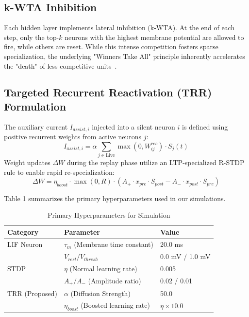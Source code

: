 \documentclass{article}
\begin{document}
\subsection{k-WTA Inhibition}
Each hidden layer implements lateral inhibition (k-WTA). At the end of each step, only the top-$k$ neurons with the highest membrane potential are allowed to fire, while others are reset. While this intense competition fosters sparse specialization, the underlying "Winners Take All" principle inherently accelerates the "death" of less competitive units~\cite{hellman1998winners}.

\subsection{Targeted Recurrent Reactivation (TRR) Formulation}
The auxiliary current $I_{assist,i}$ injected into a silent neuron $i$ is defined using positive recurrent weights from active neurons $j$:
\begin{equation}
I_{assist,i} = \alpha \sum_{j \in \text{Live}} \max(0, W_{ij}^{rec}) \cdot S_j(t)
\end{equation}
Weight updates $\Delta W$ during the replay phase utilize an LTP-specialized R-STDP rule to enable rapid re-specialization:
\begin{equation}
\Delta W = \eta_{boost} \cdot \max(0, R) \cdot (A_+ \cdot x_{pre} \cdot S_{post} - A_- \cdot x_{post} \cdot S_{pre})
\end{equation}

Table 1 summarizes the primary hyperparameters used in our simulations.

\begin{table}[h]
\centering
\caption{Primary Hyperparameters for Simulation}
\begin{tabular}{lll}
\toprule
Category & Parameter & Value \\ \midrule
LIF Neuron & $\tau_m$ (Membrane time constant) & 20.0 ms \\ 
 & $V_{rest} / V_{thresh}$ & 0.0 mV / 1.0 mV \\ \midrule
STDP & $\eta$ (Normal learning rate) & 0.005 \\ 
 & $A_+ / A_-$ (Amplitude ratio) & 0.02 / 0.01 \\ \midrule
TRR (Proposed) & $\alpha$ (Diffusion Strength) & 50.0 \\ 
 & $\eta_{boost}$ (Boosted learning rate) & $\eta \times 10.0$ \\ \bottomrule
\end{tabular}
\end{table}
\end{document}
